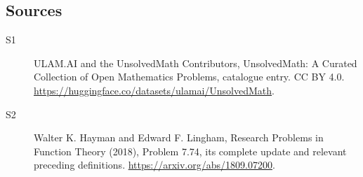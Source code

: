 \documentclass[11pt]{article}
\begin{document}
\subsection{Sources}
\begin{description}
\item[\hypertarget{source:statement:1}{S1}] ULAM.AI and the UnsolvedMath Contributors, UnsolvedMath: A Curated Collection of Open Mathematics Problems, catalogue entry. CC BY 4.0. \url{https://huggingface.co/datasets/ulamai/UnsolvedMath}.
\item[\hypertarget{source:statement:2}{S2}] Walter K. Hayman and Edward F. Lingham, Research Problems in Function Theory (2018), Problem 7.74, its complete update and relevant preceding definitions. \url{https://arxiv.org/abs/1809.07200}.
\end{description}
\label{end:statement}
\end{document}
